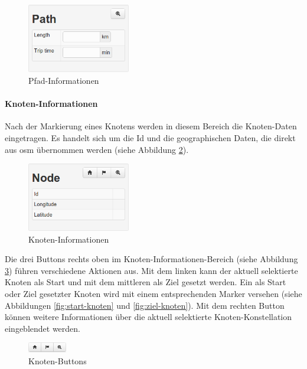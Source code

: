 \documentclass[
  a4paper,
  10pt
]{scrreprt}
\begin{document}
\begin{figure}[htbp]
  \centering
  \includegraphics[width=0.4\textwidth]{Bilder/Pfad-Informationen.png}
  \caption{Pfad-Informationen}
  \label{fig:pfad-informationen}
\end{figure}

\paragraph{Knoten-Informationen}
\label{sec:knoten-informationen}

Nach der Markierung eines Knotens werden in diesem Bereich die Knoten-Daten eingetragen.
Es handelt sich um die Id und die geographischen Daten, die direkt aus \gls{osm} übernommen werden (siehe Abbildung \ref{fig:knoten-informationen}).

\begin{figure}[htbp]
  \centering
  \includegraphics[width=0.4\textwidth]{Bilder/Knoten-Informationen.png}
  \caption{Knoten-Informationen}
  \label{fig:knoten-informationen}
\end{figure}

Die drei Buttons rechts oben im Knoten-Informationen-Bereich (siehe Abbildung \ref{fig:knoten-buttons}) führen verschiedene Aktionen aus.
Mit dem linken kann der aktuell selektierte Knoten als Start und mit dem mittleren als Ziel gesetzt werden.
Ein als Start oder Ziel gesetzter Knoten wird mit einem entsprechenden Marker versehen (siehe Abbildungen \ref{fig:start-knoten} und \ref{fig:ziel-knoten}).
Mit dem rechten Button können weitere Informationen über die aktuell selektierte Knoten-Konstellation eingeblendet werden.

\begin{figure}[htbp]
  \centering
  \includegraphics[width=0.15\textwidth]{Bilder/Knoten-Buttons.png}
  \caption{Knoten-Buttons}
  \label{fig:knoten-buttons}
\end{figure}
\end{document}
